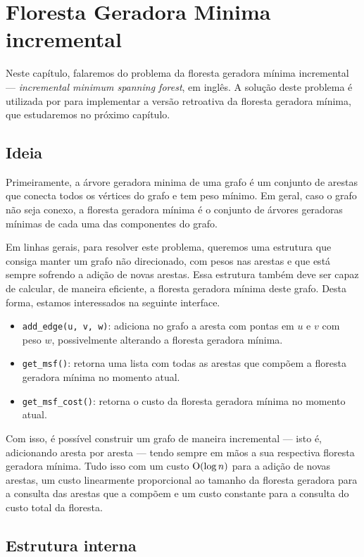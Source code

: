 
\chapter{Floresta Geradora Minima incremental}
\label{cap:incremental-msf}

Neste capítulo, falaremos do problema da floresta geradora mínima incremental --- \emph{incremental minimum spanning forest}, em inglês. A solução deste problema é utilizada por \citet{10.1093/comjnl/bxaa135} para implementar a versão retroativa da floresta geradora mínima, que estudaremos no próximo capítulo.

\section{Ideia}
\label{sec:imsf-ideia}

Primeiramente, a árvore geradora minima de uma grafo é um conjunto de arestas que conecta todos os vértices do grafo e tem peso mínimo. Em geral, caso o grafo não seja conexo, a floresta geradora mínima é o conjunto de árvores geradoras mínimas de cada uma das componentes do grafo.

Em linhas gerais, para resolver este problema, queremos uma estrutura que consiga manter um grafo não direcionado, com pesos nas arestas e que está sempre sofrendo a adição de novas arestas. Essa estrutura também deve ser capaz de calcular, de maneira eficiente, a floresta geradora mínima deste grafo. Desta forma, estamos interessados na seguinte interface.

\begin{itemize}
    \item \texttt{add\_edge(u, v, w)}: adiciona no grafo a aresta com pontas em $u$ e $v$ com peso $w$, possivelmente alterando a floresta geradora mínima.
    \item \texttt{get\_msf()}: retorna uma lista com todas as arestas que compõem a floresta geradora mínima no momento atual.
    \item \texttt{get\_msf\_cost()}: retorna o custo da floresta geradora mínima no momento atual.
\end{itemize}

Com isso, é possível construir um grafo de maneira incremental --- isto é, adicionando aresta por aresta --- tendo sempre em mãos a sua respectiva floresta geradora mínima. Tudo isso com um custo $\mathrm{O} (\log n)$ para a adição de novas arestas, um custo linearmente proporcional ao tamanho da floresta geradora para a consulta das arestas que a compõem e um custo constante para a consulta do custo total da floresta.

\section{Estrutura interna}
\label{sec:imsf-est-int}




